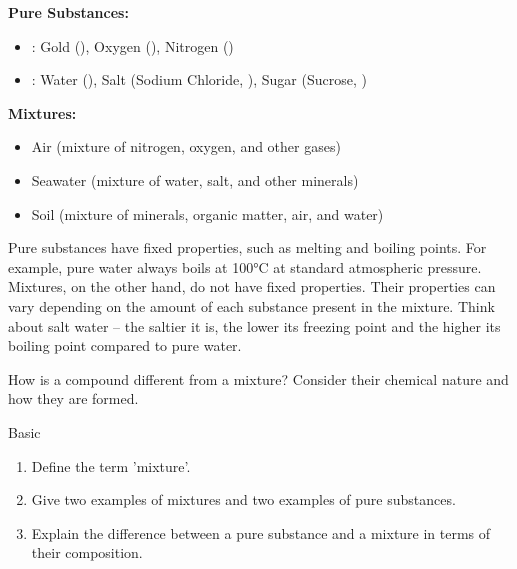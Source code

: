 \begin{example}
\textbf{Pure Substances:}
\begin{itemize}
    \item {}: Gold (), Oxygen (), Nitrogen ()
    \item {}: Water (), Salt (Sodium Chloride, ), Sugar (Sucrose, )
\end{itemize}
\textbf{Mixtures:}
\begin{itemize}
    \item Air (mixture of nitrogen, oxygen, and other gases)
    \item Seawater (mixture of water, salt, and other minerals)
    \item Soil (mixture of minerals, organic matter, air, and water)
\end{itemize}
\end{example}


Pure substances have fixed properties, such as melting and boiling points. For example, pure water always boils at 100°C at standard atmospheric pressure. Mixtures, on the other hand, do not have fixed properties. Their properties can vary depending on the amount of each substance present in the mixture.  Think about salt water – the saltier it is, the lower its freezing point and the higher its boiling point compared to pure water.

\begin{stopandthink}
How is a compound different from a mixture? Consider their chemical nature and how they are formed.
\end{stopandthink}

\begin{tieredquestions}{Basic}
\begin{enumerate}
    \item Define the term 'mixture'.
    \item Give two examples of mixtures and two examples of pure substances.
    \item Explain the difference between a pure substance and a mixture in terms of their composition.
\end{enumerate}
\end{tieredquestions}

